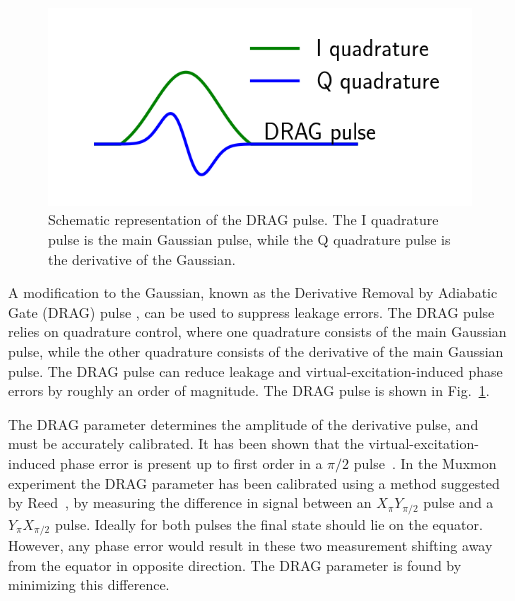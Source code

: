         \begin{figure}
          \begin{center}
          \vspace{-30pt}
            \includegraphics[width=\textwidth]{Figures/Exploring frequency reuse/DRAG pulse.png}
          \end{center}
          \vspace{-20 pt}
          \caption{Schematic representation of the DRAG pulse. The I quadrature pulse is the main Gaussian pulse, while the Q quadrature pulse is the derivative of the Gaussian.}
          \label{fig:DRAG pulse}
        \end{figure}

        A modification to the Gaussian, known as the Derivative Removal by Adiabatic Gate (DRAG) pulse \cite{motzoi2009simple}, can be used to suppress leakage errors. The DRAG pulse relies on quadrature control, where one quadrature consists of the main Gaussian pulse, while the other quadrature consists of the derivative of the main Gaussian pulse. The DRAG pulse can reduce leakage and virtual-excitation-induced phase errors by roughly an order of magnitude. The DRAG pulse is shown in Fig.~\ref{fig:DRAG pulse}.

        The DRAG parameter determines the amplitude of the derivative pulse, and must be accurately calibrated. It has been shown that the virtual-excitation-induced phase error is present up to first order in a $\pi/2$ pulse~\cite{lucero2010reduced}. In the Muxmon experiment the DRAG parameter has been calibrated using a method suggested by Reed~\cite{Reed}, by measuring the difference in signal between an $X_{\pi} Y_{\pi/2}$ pulse and a $Y_{\pi} X_{\pi/2}$ pulse. Ideally for both pulses the final state should lie on the equator. However, any phase error would result in these two measurement shifting away from the equator in opposite direction. The DRAG parameter is found by minimizing this difference.

